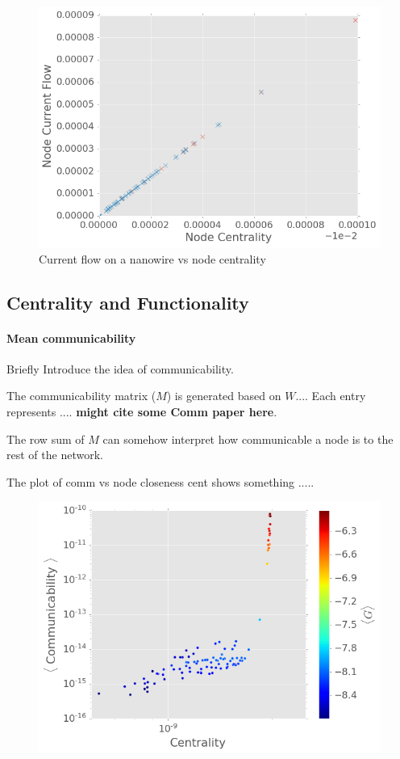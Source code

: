 \documentclass[%
 reprint,
 amsmath,amssymb,
 aps,
]{revtex4-2}
\begin{document}
\begin{figure}[h]
	\centering
	\includegraphics[width=1\linewidth]{figure/I_cent}
	\caption{Current flow on a nanowire vs node centrality}
	\label{fig:i_cent}
\end{figure}

\subsection{\label{sec:level2} Centrality and Functionality}

\paragraph{Mean communicability}
Briefly Introduce the idea of communicability. 

The communicability matrix ($M$) is generated based on $W$.... Each entry represents .... \textbf{might cite some Comm paper here}.

The row sum of $M$ can somehow interpret how communicable a node is to the rest of the network.

The plot of comm vs node closeness cent shows something .....

\begin{figure}[h]
	\centering
	\includegraphics[width=1\linewidth]{figure/comm_cent}
	\caption{}
	\label{fig:comm_cent}
\end{figure}
\end{document}
